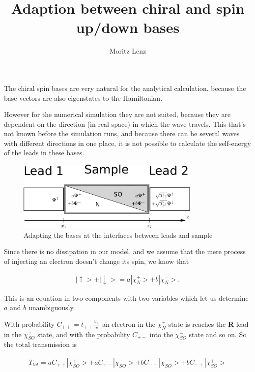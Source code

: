 \documentclass[11pt]{article}
\author{Moritz Lenz}
\title{Adaption between chiral and spin up/down bases}
\begin{document}
\maketitle

The chiral spin bases are very natural for the analytical calculation, because the
base vectors are also eigenstates to the Hamiltonian.

However for the numerical simulation they are not suited, because they are
dependent on the direction (in real space) in which the wave travels. This
that's not known before the simulation runs, and because there can be several
waves with different directions in one place, it is not possible to calculate
the self-energy of the leads in these bases.

\begin{figure}
    \begin{center}
    \includegraphics[width=0.8\textwidth]{adapting-pic.pdf}
    \end{center}
    \caption{Adapting the bases at the interfaces between leads and sample}
\end{figure}

Since there is no dissipation in our model, and we assume that the mere
process of injecting an electron doesn't change its spin, we know that

\begin{align*}
    |\uparrow> + |\downarrow> = a |\chi_N^+> + b |\chi_N^->.
\end{align*}

This is an equation in two components with two variables which let us
determine $a$ and $b$ unambiguously.

With probability $C_{++} = t_{++} \frac{v_+}{v}$ an electron in
the $\chi_N^+$ state is reaches the
\textbf{R} lead in the $\chi_{SO}^+$ state, and with the probability $C_{+-}$
into the $\chi_{SO}^-$ state and so on. So the total transmission is 

\begin{align*}
   T_{tot} =  a C_{++}|\chi_{SO}^+>
            + a C_{+-}|\chi_{SO}^->
            + b C_{--}|\chi_{SO}^->
            + b C_{-+}|\chi_{SO}^+>
\end{align*}
\end{document}
